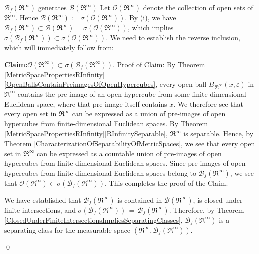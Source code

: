 \begin{enumerate}
	\vskip 0.3cm
	\noindent
	\underline{$\mathcal{B}_{f}\!\left(\Re^{\infty}\right)$ generates $\mathcal{B}(\Re^{\infty})$}
	\vskip 0.0cm
	\noindent
	Let $\mathcal{O}(\Re^{\infty})$ denote the collection of open sets of $\Re^{\infty}$.
	Hence $\mathcal{B}(\Re^{\infty}) := \sigma(\mathcal{O}(\Re^{\infty}))$.
	By (i), we have
	$\mathcal{B}_{f}(\Re^{\infty}) \subset \mathcal{B}(\Re^{\infty}) = \sigma(\mathcal{O}(\Re^{\infty}))$,
	which implies $\sigma(\mathcal{B}_{f}(\Re^{\infty})) \subset \sigma(\mathcal{O}(\Re^{\infty}))$.
	We need to establish the reverse inclusion, which will immediately follow from:
	\begin{center}
	\begin{minipage}{6.25in}
	\textbf{Claim:}\quad$\mathcal{O}(\Re^{\infty}) \subset \sigma(\mathcal{B}_{f}(\Re^{\infty}))$.
	\vskip 0.1cm
	\noindent
	Proof of Claim:\quad
	By Theorem \ref{MetricSpacePropertiesRInfinity}\eqref{OpenBallsContainPreimagesOfOpenHypercubes},
	every open ball $B_{\mbox{}\,\Re^{\infty}}\!\left(x,\varepsilon\right)$ in $\Re^{\infty}$ contains
	the pre-image of an open hypercube from some finite-dimensional Euclidean space, where that pre-image
	itself contains $x$.
	We therefore see that every open set in $\Re^{\infty}$ can be expressed as a union
	of pre-images of open hypercubes from finite-dimensional Euclidean spaces.
	By Theorem \ref{MetricSpacePropertiesRInfinity}\eqref{RInfinitySeparable},
	{\color{red}$\Re^{\infty}$ is separable}.
	Hence, by Theorem \ref{CharacterizationOfSeparabilityOfMetricSpaces}, we see that every
	open set in $\Re^{\infty}$ can be expressed as a countable union of pre-images of open
	hypercubes from finite-dimensional Euclidean spaces.
	Since pre-images of open hypercubes from finite-dimensional Euclidean spaces belong
	to $\mathcal{B}_{f}(\Re^{\infty})$, we see that
	$\mathcal{O}(\Re^{\infty}) \subset \sigma(\mathcal{B}_{f}(\Re^{\infty}))$.
	This completes the proof of the Claim.
	\end{minipage}
	\end{center}
	We have established that $\mathcal{B}_{f}(\Re^{\infty})$ is contained in $\mathcal{B}(\Re^{\infty})$,
	is closed under finite intersections, and
	$\sigma(\mathcal{B}_{f}(\Re^{\infty}))\,=\,\mathcal{B}_{f}(\Re^{\infty})$.
	Therefore, by Theorem \ref{ClosedUnderFiniteIntersectionsImpliesSeparatingClasses},
	$\mathcal{B}_{f}(\Re^{\infty})$ is a separating class for the measurable space
	$\left(\Re^{\infty},\mathcal{B}_{f}(\Re^{\infty})\right)$.
\end{enumerate}
\qed

